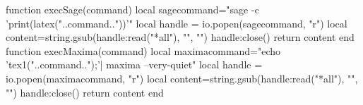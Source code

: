 \documentclass[a4paper]{ltjsarticle}
\begin{document}

\begin{luacode*}
function execSage(command)
  local sagecommand="sage -c 'print(latex("..command.."))'"
  local handle = io.popen(sagecommand, "r")
  local content=string.gsub(handle:read("*all"), "\n", "")
  handle:close()
  return content
end
function execMaxima(command)
  local maximacommand="echo 'tex1("..command..");'| maxima --very-quiet"
  local handle = io.popen(maximacommand, "r")
  local content=string.gsub(handle:read("*all"), "\n", "")
  handle:close()
  return content
end
\end{luacode*}

\end{document}
